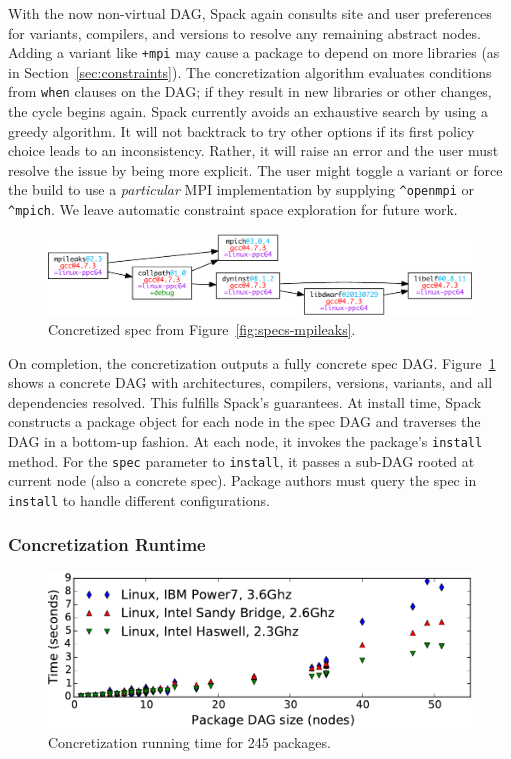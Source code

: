 With the now non-virtual DAG, Spack again consults site and user preferences for
variants, compilers, and versions to resolve any remaining abstract nodes.
Adding a variant like {\tt +mpi} may cause a package to depend on more
libraries (as in Section~\ref{sec:constraints}). The concretization algorithm
evaluates conditions from {\tt when} clauses on the DAG; if they result in
new libraries or other changes, the cycle begins again.
Spack currently avoids an exhaustive search by using a greedy algorithm.
It will not backtrack to try other options if its first policy choice leads
to an inconsistency.  Rather, it will raise an error and the user must resolve
the issue by being more explicit.  The user might toggle a variant or force 
the build to use a {\it particular} MPI implementation
by supplying \verb|^openmpi| or \verb|^mpich|.  We leave automatic constraint
space exploration for future work.

\begin{figure}
	\centering
	\includegraphics[width=\columnwidth]{specs/mpileaks-concrete.pdf}
	\caption{
		Concretized spec from Figure~\ref{fig:specs-mpileaks}.
		\label{fig:specs-mpileaks-concrete}
	}
\end{figure}
On completion, the concretization outputs a fully concrete spec DAG.
Figure~\ref{fig:specs-mpileaks-concrete} shows a concrete DAG with architectures,
compilers, versions, variants, and all dependencies resolved.
This fulfills Spack's guarantees.
%
At install time, Spack constructs a package object for each node in the spec DAG
and traverses the DAG in a bottom-up fashion.  At each node, it invokes the package's
{\tt install} method.  For the {\tt spec} parameter to {\tt install}, it passes
a sub-DAG rooted at current node (also a concrete spec).  Package authors must
query the spec in {\tt install} to handle different configurations.

\subsubsection{Concretization Runtime}
\label{sec:concretization-overhead}

\begin{figure}
	\centering
	\includegraphics[width=.95\columnwidth]{figs/concretization-overhead/concretization-times.pdf}
	\caption{
		Concretization running time for 245 packages.
		\label{fig:concretization-time}
	}
\end{figure}

